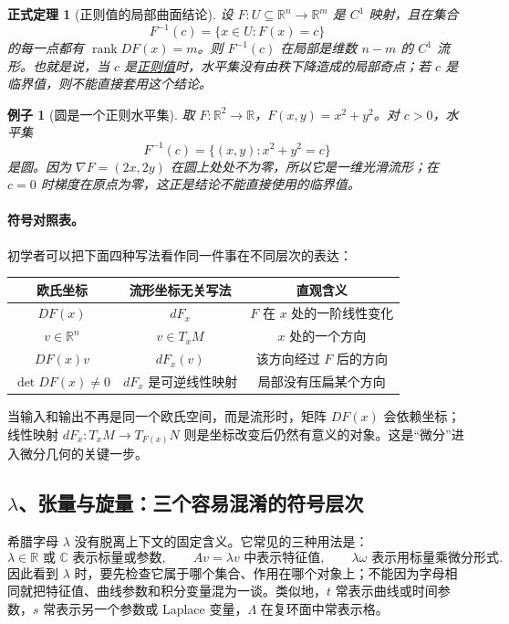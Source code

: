 \documentclass[UTF8,fontset=none,a4paper,11pt]{ctexart}
\theoremstyle{foundation-definition}
\theoremstyle{foundation-theorem}
\newtheorem{theorem}[definition]{正式定理}
\theoremstyle{foundation-proposition}
\theoremstyle{foundation-example}
\newtheorem{example}[definition]{例子}
\theoremstyle{foundation-remark}
\theoremstyle{foundation-theorem}
\newcommand{\term}[2]{\hyperref[#1]{#2}}
\begin{document}
\begin{theorem}[正则值的局部曲面结论]
设 \(F:U\subseteq\mathbb R^n\to\mathbb R^m\) 是 \(C^1\) 映射，且在集合
\[
F^{-1}(c)=\{x\in U:F(x)=c\}
\]
的每一点都有 \(\operatorname{rank}DF(x)=m\)。则 \(F^{-1}(c)\) 在局部是维数 \(n-m\) 的 \(C^1\) 流形。也就是说，当 \(c\) 是\term{def:regular-value}{正则值}时，水平集没有由秩下降造成的局部奇点；若 \(c\) 是临界值，则不能直接套用这个结论。
\end{theorem}

\begin{example}[圆是一个正则水平集]
取 \(F:\mathbb R^2\to\mathbb R\)，\(F(x,y)=x^2+y^2\)。对 \(c>0\)，水平集
\[
F^{-1}(c)=\{(x,y):x^2+y^2=c\}
\]
是圆。因为 \(\nabla F=(2x,2y)\) 在圆上处处不为零，所以它是一维光滑流形；在 \(c=0\) 时梯度在原点为零，这正是结论不能直接使用的临界值。
\end{example}

\paragraph{符号对照表。}
初学者可以把下面四种写法看作同一件事在不同层次的表达：
\begin{center}
\begin{tabular}{c|c|c}
欧氏坐标 & 流形坐标无关写法 & 直观含义 \\
\hline
\(DF(x)\) & \(dF_x\) & \(F\) 在 \(x\) 处的一阶线性变化 \\
\(v\in\mathbb R^n\) & \(v\in T_xM\) & \(x\) 处的一个方向 \\
\(DF(x)v\) & \(dF_x(v)\) & 该方向经过 \(F\) 后的方向 \\
\(\det DF(x)\neq0\) & \(dF_x\) 是可逆线性映射 & 局部没有压扁某个方向
\end{tabular}
\end{center}
当输入和输出不再是同一个欧氏空间，而是流形时，矩阵 \(DF(x)\) 会依赖坐标；线性映射 \(dF_x:T_xM\to T_{F(x)}N\) 则是坐标改变后仍然有意义的对象。这是“微分”进入微分几何的关键一步。

\subsection{\texorpdfstring{\(\lambda\)、张量与旋量：三个容易混淆的符号层次}{lambda、张量与旋量：三个容易混淆的符号层次}}

希腊字母 \(\lambda\) 没有脱离上下文的固定含义。它常见的三种用法是：
\[
\lambda\in\mathbb R\text{ 或 }\mathbb C\text{ 表示标量或参数},\qquad
Av=\lambda v\text{ 中表示特征值},\qquad
\lambda\omega\text{ 表示用标量乘微分形式}.
\]
因此看到 \(\lambda\) 时，要先检查它属于哪个集合、作用在哪个对象上；不能因为字母相同就把特征值、曲线参数和积分变量混为一谈。类似地，\(t\) 常表示曲线或时间参数，\(s\) 常表示另一个参数或 Laplace 变量，\(\Lambda\) 在复环面中常表示格。
\end{document}
